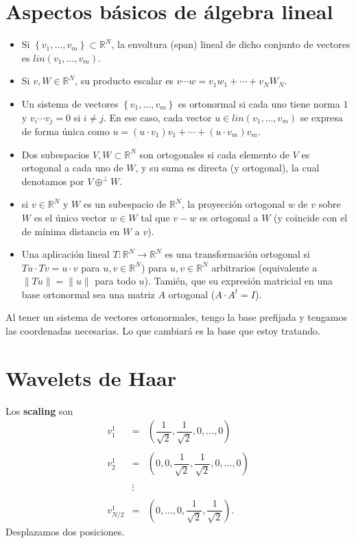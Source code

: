 \section{Aspectos básicos de álgebra lineal}
\begin{itemize}
    \item Si $\left\{v_1,\ldots,v_m\right\}\subset \mathbb{R}^N$, la envoltura (span) lineal de dicho conjunto de vectores es $lin(v_1,\ldots,v_m)$.
    \item Si $v,W\in \mathbb{R}^N$, su producto escalar es $v\cdots w=v_1w_1+\cdots+v_N W_N$.
    \item Un sistema de vectores $\left\{v_1,\ldots,v_m\right\}$ es ortonormal si cada uno tiene norma $1$ y $v_i\cdots v_j=0$ si $i\neq j$. En ese caso, cada vector $u\in lin(v_1,\ldots,v_m)$ se expresa de forma única como $u=(u\cdot v_1)v_1+\cdots+(u\cdot v_m)v_m.$
    \item Dos subespacios $V,W\subset \mathbb{R}^N$ son ortogonales si cada elemento de $V$ es ortogonal a cada uno de $W$, y su suma es directa (y ortogonal), la cual denotamos por $V\oplus^{\perp} W$.
    \item si $v\in \mathbb{R}^N$ y $W$ es un subespacio de $\mathbb{R}^N$, la proyección ortogonal $w$ de $v$ sobre $W$ es el único vector $w\in W$ tal que $v-w$ es ortogonal a $W$ (y coincide con el de mínima distancia en $W$ a $v$).
    \item Una aplicación lineal $T:\mathbb{R}^N\to \mathbb{R}^N$ es una transformación ortogonal si $Tu\cdot Tv=u\cdot v$  para $u,v\in \mathbb{R}^N$) para $u,v\in \mathbb{R}^N$ arbitrarios (equivalente a $\|Tu\|=\|u\|$ para todo $u$). Tamién, que su expresión matricial en una base ortonormal sea una matriz $A$ ortogonal ($A\cdot A^t=I$).
\end{itemize}

Al tener un sistema de vectores ortonormales, tengo la base prefijada y tengamos las coordenadas necesarias. Lo que cambiará es la base que estoy tratando. 

\section{Wavelets de Haar}
Los \textbf{scaling} son
$$
\begin{array}{rcl}
    v_1^1 &=&\left(\dfrac{1}{\sqrt{2}},\dfrac{1}{\sqrt{2}},0,\ldots,0\right)\\\\
    v_2^1 &=& \left(0,0,\dfrac{1}{\sqrt{2}},\dfrac{1}{\sqrt{2}},0,\ldots,0\right)\\\\
    &\vdots&\\\\
    v_{N/2}^1 &=& \left(0,\ldots,0,\dfrac{1}{\sqrt{2}},\dfrac{1}{\sqrt{2}}\right).
\end{array}
$$
Desplazamos dos posiciones.

